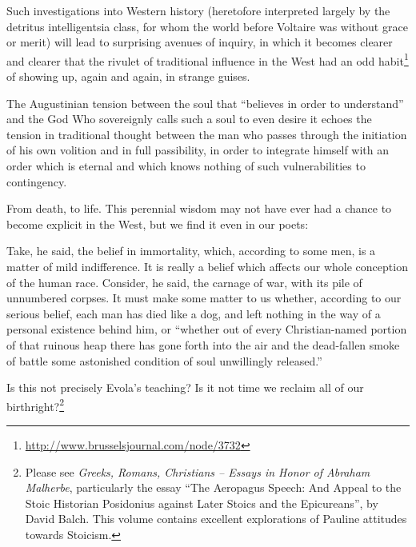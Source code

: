 Such investigations into Western history (heretofore interpreted largely by the detritus intelligentsia class, for whom the world before Voltaire was without grace or merit) will lead to surprising avenues of inquiry, in which it becomes clearer and clearer that the rivulet of traditional influence in the West had an odd habit\footnote{\url{http://www.brusselsjournal.com/node/3732}} of showing up, again and again, in strange guises.

The Augustinian tension between the soul that ``believes in order to understand'' and the God Who sovereignly calls such a soul to even desire it echoes the tension in traditional thought between the man who passes through the initiation of his own volition and in full passibility, in order to integrate himself with an order which is eternal and which knows nothing of such vulnerabilities to contingency.

From death, to life. This perennial wisdom may not have ever had a chance to become explicit in the West, but we find it even in our poets:

\begin{quotex}
Take, he said, the belief in immortality, which, according to some men, is a matter of mild indifference. It is really a belief which affects our whole conception of the human race. Consider, he said, the carnage of war, with its pile of unnumbered corpses. It must make some matter to us whether, according to our serious belief, each man has died like a dog, and left nothing in the way of a personal existence behind him, or ``whether out of every Christian-named portion of that ruinous heap there has gone forth into the air and the dead-fallen smoke of battle some astonished condition of soul unwillingly released.''

\end{quotex}


Is this not precisely Evola's teaching? Is it not time we reclaim all of our birthright?\footnote{Please see \textit{Greeks, Romans, Christians -- Essays in Honor of Abraham Malherbe}, particularly the essay ``The Aeropagus Speech: And Appeal to the Stoic Historian Posidonius against Later Stoics and the Epicureans'', by David Balch. This volume contains excellent explorations of Pauline attitudes towards Stoicism.}



